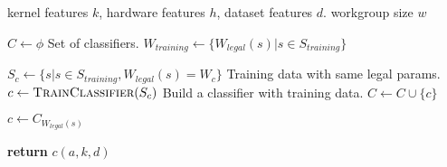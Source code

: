 \begin{algorithmic}[1]
  \Require kernel features $k$, hardware features $h$, dataset features
  $d$.
  \Ensure workgroup size $w$

  \State $C \leftarrow \phi$
  \Comment Set of classifiers.
  \State $W_{training} \leftarrow \{ W_{legal}(s) | s \in S_{training}
  \}$

  \State $S_c \leftarrow \{ s | s \in S_{training}, W_{legal}(s) = W_c
  \}$
  \Comment Training data with same legal params.
  \State $c \leftarrow \text{\sc{TrainClassifier}}(S_c)$
  \Comment Build a classifier with training data.
  \State $C \leftarrow C \cup \{ c \}$
  \EndFor

  \State $c \leftarrow C_{W_{legal}(s)}$

  \State \textbf{return} $c(a, k, d)$
\end{algorithmic}
